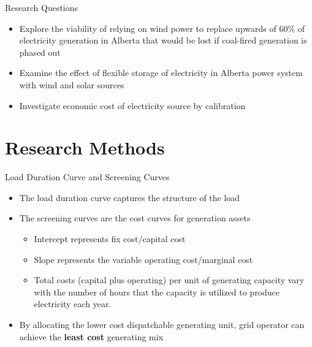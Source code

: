 \documentclass[newPxFont,numfooter,progressbar,sectionpages]{beamer}
\begin{document}

\begin{frame}[c]{Research Questions}

\begin{itemize}
\item Explore the viability of relying on wind power to replace upwards of 60\% of electricity generation in Alberta that would be lost if coal-fired generation is phased out
\item Examine the effect of flexible storage of electricity in Alberta power system with wind and solar sources
\item Investigate economic cost of electricity source by calibration

\end{itemize}


\end{frame}


%
%
\section{Research Methods}





\begin{frame}[c]{Load Duration Curve and Screening Curves}

\begin{itemize}
\item The load duration curve captures the structure of the load  
\item The screening curves are the cost curves for generation assets
\begin{itemize}
\item Intercept represents fix cost/capital cost
\item Slope represents the variable operating cost/marginal cost
\item Total costs (capital plus operating) per unit of generating capacity vary with the
number of hours that the capacity is utilized to produce electricity each year.		
\end{itemize}

\item By allocating the lower cost dispatchable generating unit, grid operator can achieve the \textbf{least cost} generating mix 

\end{itemize}


\end{frame}
\end{document}
